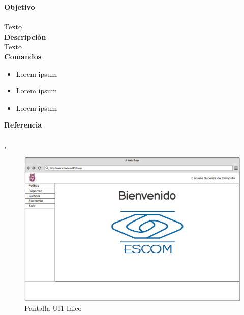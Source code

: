 
\Large{\textbf{Objetivo}}\\\\
\normalsize{Texto}\\

	

\Large{\textbf{Descripción}}\\
\normalsize{Texto}\\

\Large{\textbf{Comandos}}\\
\normalsize{}

\begin{itemize}
	\item Lorem ipsum
	\item Lorem ipsum
	\item Lorem ipsum
\end{itemize}


\Large{\textbf{Referencia}}\\\\
\normalsize{,}

\begin{figure}[h]
  \centering
	\includegraphics[scale=.35]{imagenes/Pantallas/UI1}
  \caption{Pantalla UI1 Inico}
  \label{fig:UI1}
\end{figure}




